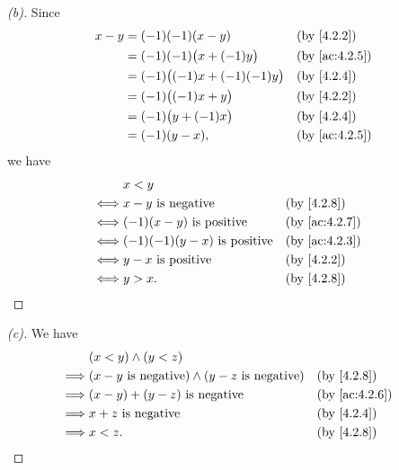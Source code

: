 \begin{proof}[(b)]
  Since
  \begin{align*}
    x - y & = (-1)(-1)(x - y)                 &  & \by{4.2.2}    \\
          & = (-1)(-1)\big(x + (-1)y\big)     &  & \by{ac:4.2.5} \\
          & = (-1)\big((-1)x + (-1)(-1)y\big) &  & \by{4.2.4}    \\
          & = (-1)\big((-1)x + y\big)         &  & \by{4.2.2}    \\
          & = (-1)\big(y + (-1)x\big)         &  & \by{4.2.4}    \\
          & = (-1)(y - x),                    &  & \by{ac:4.2.5}
  \end{align*}
  we have
  \begin{align*}
         & x < y                                                  \\
    \iff & x - y \text{ is negative}           &  & \by{4.2.8}    \\
    \iff & (-1)(x - y) \text{ is positive}     &  & \by{ac:4.2.7} \\
    \iff & (-1)(-1)(y - x) \text{ is positive} &  & \by{ac:4.2.3} \\
    \iff & y - x \text{ is positive}           &  & \by{4.2.2}    \\
    \iff & y > x.                              &  & \by{4.2.8}
  \end{align*}
\end{proof}

\begin{proof}[(c)]
  We have
  \begin{align*}
             & (x < y) \land (y < z)                                                            \\
    \implies & (x - y \text{ is negative}) \land (y - z \text{ is negative}) &  & \by{4.2.8}    \\
    \implies & (x - y) + (y - z) \text{ is negative}                         &  & \by{ac:4.2.6} \\
    \implies & x + z \text{ is negative}                                     &  & \by{4.2.4}    \\
    \implies & x < z.                                                        &  & \by{4.2.8}
  \end{align*}
\end{proof}

